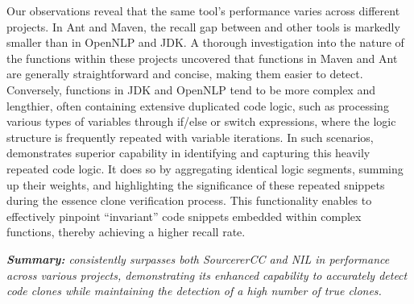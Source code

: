 Our observations reveal that the same tool's performance varies across different projects. 
In Ant and Maven, the recall gap between \toolname and other tools is markedly smaller than in OpenNLP and JDK. 
A thorough investigation into the nature of the functions within these projects uncovered that functions in Maven and Ant are generally straightforward and concise, making them easier to detect. 
Conversely, functions in JDK and OpenNLP tend to be more complex and lengthier, often containing extensive duplicated code logic, such as processing various types of variables through if/else or switch expressions, where the logic structure is frequently repeated with variable iterations.
In such scenarios, \toolname demonstrates superior capability in identifying and capturing this heavily repeated code logic. 
It does so by aggregating identical logic segments, summing up their weights, and highlighting the significance of these repeated snippets during the essence clone verification process. 
This functionality enables \toolname to effectively pinpoint ``invariant'' code snippets embedded within complex functions, thereby achieving a higher recall rate. 






\begin{titleEnv}
\emph{
\textbf{Summary:}
\toolname consistently surpasses both SourcererCC and NIL in performance across various projects, demonstrating its enhanced capability to accurately detect code clones while maintaining the detection of a high number of true clones.
}
\end{titleEnv}


